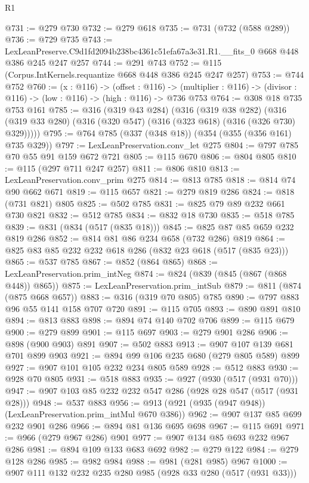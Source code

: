 \begin{lexlean}{R1}
\begin{coremodule}
@731 := @279 @730
@732 := @279 @618
@735 := @731 (@732 (@588 @289))
@736 := @729 @735
@743 := LexLeanPreserve.C9d1fd2094b238bc4361c51efa67a3e31.R1.__fits_0 @668 @448 @386 @245 @247 @257
@744 := @291 @743
@752 := @115 (Corpus.IntKernels.requantize @668 @448 @386 @245 @247 @257)
@753 := @744 @752
@760 := (x : @116) ->
  (offset : @116) ->
  (multiplier : @116) -> (divisor : @116) -> (low : @116) -> (high : @116) -> @736 @753
@764 := @308 @18 @735 @753 @161
@785 := @316
    (@319 @43 @284)
    (@316
      (@319 @38 @282)
      (@316 (@319 @33 @280) (@316 (@320 @547) (@316 (@323 @618) (@316 (@326 @730) @329)))))
@795 := @764 @785 (@337 (@348 @18)) (@354 (@355 (@356 @161) @735 @329))
@797 := LexLeanPreservation.conv_let @275
@804 := @797 @785 @70 @55 @91 @159 @672 @721
@805 := @115 @670
@806 := @804 @805
@810 := @115 (@297 @711 @247 @257)
@811 := @806 @810
@813 := LexLeanPreservation.conv_prim @275
@814 := @813 @785
@818 := @814 @74 @90 @662 @671
@819 := @115 @657
@821 := @279 @819 @286
@824 := @818 (@731 @821) @805
@825 := @502 @785
@831 := @825 @79 @89 @232 @661 @730 @821
@832 := @512 @785
@834 := @832 @18 @730
@835 := @518 @785
@839 := @831 (@834 (@517 (@835 @18)))
@845 := @825 @87 @85 @659 @232 @819 @286
@852 := @814 @81 @86 @234 @658 (@732 @286) @819
@864 := @825 @83 @85 @232 @232 @618 @286 (@832 @23 @618 (@517 (@835 @23)))
@865 := @537 @785
@867 := @852 (@864 @865)
@868 := LexLeanPreservation.prim_intNeg
@874 := @824 (@839 (@845 (@867 (@868 @448)) @865))
@875 := LexLeanPreservation.prim_intSub
@879 := @811 (@874 (@875 @668 @657))
@883 := @316 (@319 @70 @805) @785
@890 := @797 @883 @96 @55 @141 @158 @707 @720
@891 := @115 @705
@893 := @890 @891 @810
@894 := @813 @883
@898 := @894 @74 @140 @702 @706
@899 := @115 @679
@900 := @279 @899
@901 := @115 @697
@903 := @279 @901 @286
@906 := @898 (@900 @903) @891
@907 := @502 @883
@913 := @907 @107 @139 @681 @701 @899 @903
@921 := @894 @99 @106 @235 @680 (@279 @805 @589) @899
@927 := @907 @101 @105 @232 @234 @805 @589
@928 := @512 @883
@930 := @928 @70 @805
@931 := @518 @883
@935 := @927 (@930 (@517 (@931 @70)))
@947 := @907 @103 @85 @232 @232 @547 @286 (@928 @28 @547 (@517 (@931 @28)))
@948 := @537 @883
@956 := @913 (@921 (@935 (@947 @948)) (LexLeanPreservation.prim_intMul @670 @386))
@962 := @907 @137 @85 @699 @232 @901 @286
@966 := @894 @81 @136 @695 @698
@967 := @115 @691
@971 := @966 (@279 @967 @286) @901
@977 := @907 @134 @85 @693 @232 @967 @286
@981 := @894 @109 @133 @683 @692
@982 := @279 @122
@984 := @279 @128 @286
@985 := @982 @984
@988 := @981 (@281 @985) @967
@1000 := @907 @111 @132 @232 @235 @280 @985 (@928 @33 @280 (@517 (@931 @33)))

\end{coremodule}
\end{lexlean}

